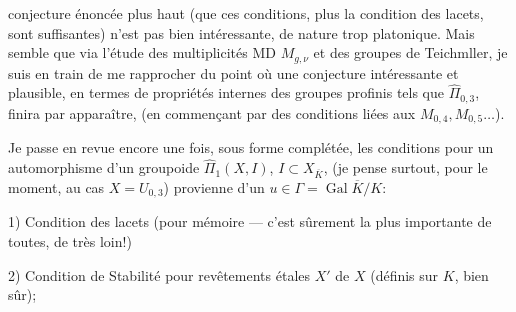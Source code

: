 conjecture énoncée plus haut (que ces conditions, plus la condition des lacets,  sont suffisantes) n'est pas bien intéressante, de nature trop platonique. Mais    semble que via l'étude des multiplicités MD $M_{g,\nu}$ et des groupes de Teichmller, je suis en train de me rapprocher du point où une conjecture intéressante et plausible, en termes de propriétés internes des groupes profinis tels que $\widehat{\Pi}_{0,3}$, finira par apparaître, (en commençant par des conditions liées aux $M_{0,4},M_{0,5}\ldots$).

Je passe en revue encore une fois, sous forme complétée, les conditions pour un automorphisme \inserted{$\Theta$} d'un groupoide $\widehat{\Pi}_1(X,I)$, $I\subset X_{\overline{K}}$,  (je pense surtout, pour le moment, au cas $X=U_{0,3}$) provienne d'un $u\in\Gamma=\operatorname{Gal}\overline{K}/K$:

1) Condition des lacets (pour mémoire --- c'est sûrement la plus importante de toutes, de très loin!)

2) Condition de Stabilité pour revêtements étales  $X'$ de $X$ (définis sur $K$, bien sûr);

